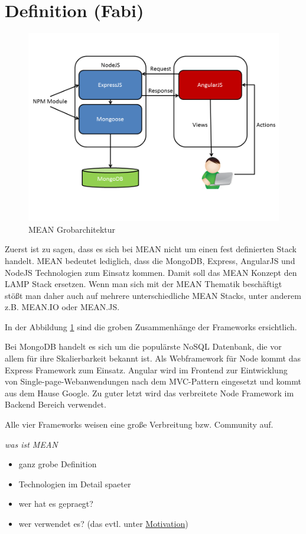 \section{Definition (Fabi)}
\label{definition-fabi}

\begin{figure}[h]
	\centering
	\includegraphics[width=0.7\linewidth]{figures/mean-grobarchitektur.png}
	\caption{MEAN Grobarchitektur}
	\label{f:mean-grobarchitektur}
\end{figure}

Zuerst ist zu sagen, dass es sich bei MEAN nicht um einen fest definierten Stack handelt. MEAN bedeutet lediglich, dass die MongoDB, Express, AngularJS und NodeJS Technologien zum Einsatz kommen. Damit soll das MEAN Konzept den LAMP Stack ersetzen. Wenn man sich mit der MEAN Thematik beschäftigt stößt man daher auch auf mehrere unterschiedliche MEAN Stacks, unter anderem z.B. MEAN.IO oder MEAN.JS.

In der Abbildung \ref{f:mean-grobarchitektur} sind die groben Zusammenhänge der Frameworks ersichtlich.

Bei MongoDB handelt es sich um die populärste NoSQL Datenbank, die vor allem für ihre Skalierbarkeit bekannt ist. Als Webframework für Node kommt das Express Framework zum Einsatz. Angular wird im Frontend zur Eintwicklung von Single-page-Webanwendungen nach dem MVC-Pattern eingesetzt und kommt aus dem Hause Google. Zu guter letzt wird das verbreitete Node Framework im Backend Bereich verwendet.

Alle vier Frameworks weisen eine große Verbreitung bzw. Community auf.

\emph{was ist MEAN}

\begin{itemize}
\itemsep1pt\parskip0pt
\item
  ganz grobe Definition
\item
  Technologien im Detail spaeter
\item
  wer hat es gepraegt?
\item
  wer verwendet es? (das evtl. unter \hyperref[motivation]{Motivation})
\end{itemize}

